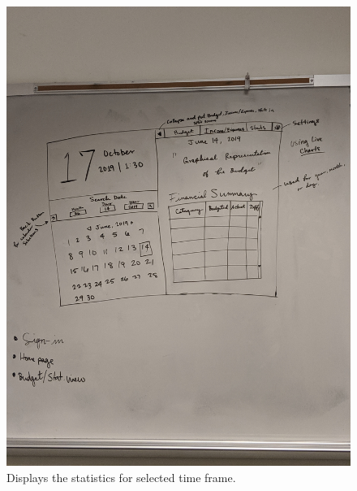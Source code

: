 \documentclass[10pt,conference,onecolumn,compsoc]{IEEEtran}
\begin{document}
\begin{figure}[h]
\centering
\begin{minipage}{.5\textwidth}
\centering
\includegraphics[scale = .05]{StatsView.jpg}
\caption{Displays the statistics for selected time frame.}
\label{StatsScreen}
\end{minipage}%
\begin{minipage}{.5\textwidth}
\centering

\end{minipage}
\end{figure}
\end{document}
